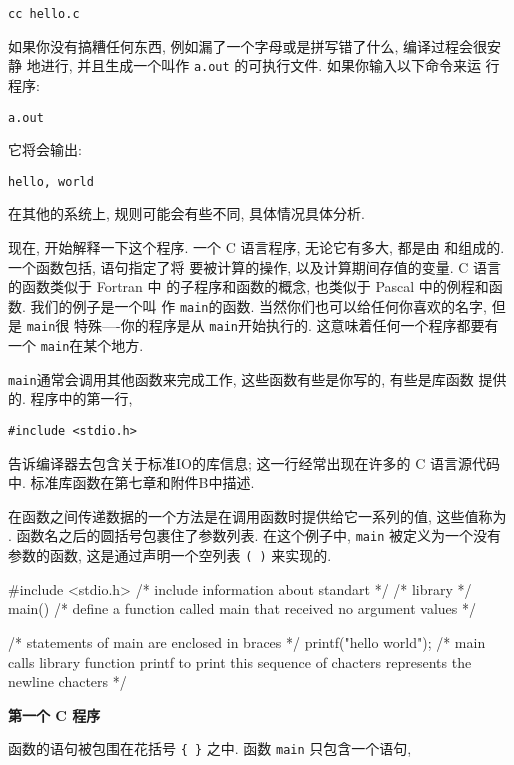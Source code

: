 \verb"cc hello.c"

如果你没有搞糟任何东西, 例如漏了一个字母或是拼写错了什么, 编译过程会很安静
地进行, 并且生成一个叫作 \verb"a.out" 的可执行文件. 如果你输入以下命令来运
行程序:

\verb"a.out"

它将会输出:

\verb"hello, world"

在其他的系统上, 规则可能会有些不同, 具体情况具体分析.

现在, 开始解释一下这个程序. 一个 C 语言程序, 无论它有多大, 都是由%
和组成的. 一个函数包括, 语句指定了将
要被计算的操作, 以及计算期间存值的变量. C 语言的函数类似于 Fortran 中
的子程序和函数的概念, 也类似于 Pascal 中的例程和函数. 我们的例子是一个叫
作 \verb"main"的函数. 当然你们也可以给任何你喜欢的名字, 但是 \verb"main"很
特殊----你的程序是从 \verb"main"开始执行的.  这意味着任何一个程序都要有一个
 \verb"main"在某个地方.

\verb"main"通常会调用其他函数来完成工作, 这些函数有些是你写的, 有些是库函数
提供的. 程序中的第一行,

\verb"#include <stdio.h>"

告诉编译器去包含关于标准IO的库信息; 这一行经常出现在许多的 C 语言源代码中.
标准库函数在第七章和附件B中描述.

在函数之间传递数据的一个方法是在调用函数时提供给它一系列的值, 这些值称为
. 函数名之后的圆括号包裹住了参数列表. 在这个例子中, \verb"main"
被定义为一个没有参数的函数, 这是通过声明一个空列表 \verb"( )" 来实现的.

\begin{myverbatim}
#include <stdio.h>              /* include information about standart */
/* library */
main()                          /* define a function called main 
                                   that received no argument values */

{                               /* statements of main are enclosed
                                   in braces */
    printf("hello world\n");    /* main calls library function printf 
                                   to print this sequence of chacters
                                   \n represents the newline chacters */
}
\end{myverbatim}

\begin{center}\textbf{第一个 C 程序}\end{center}

函数的语句被包围在花括号 \verb"{ }" 之中. 函数 \verb"main" 只包含一个语句,

